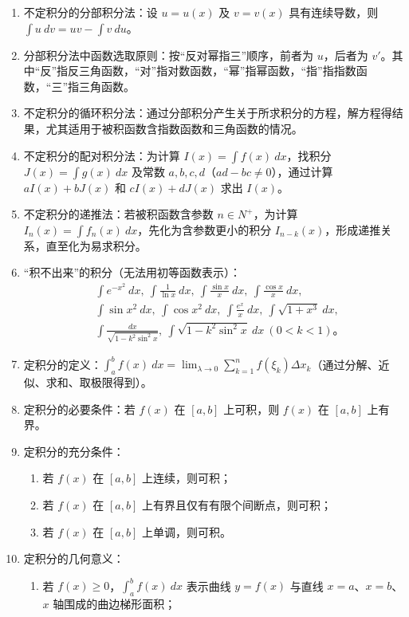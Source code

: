 \documentclass[UTF8]{ctexart}
\theoremstyle{remark}
\begin{document}
\begin{enumerate}
	\item 不定积分的分部积分法：设 \(u = u(x)\) 及 \(v = v(x)\) 具有连续导数，则 \(\int u\ dv = uv - \int v\ du\)。    
	\item 分部积分法中函数选取原则：按“反对幂指三”顺序，前者为 \(u\)，后者为 \(v'\)。其中“反”指反三角函数，“对”指对数函数，“幂”指幂函数，“指”指指数函数，“三”指三角函数。    
	\item 不定积分的循环积分法：通过分部积分产生关于所求积分的方程，解方程得结果，尤其适用于被积函数含指数函数和三角函数的情况。    
	\item 不定积分的配对积分法：为计算 \(I(x) = \int f(x)\ dx\)，找积分 \(J(x) = \int g(x)\ dx\) 及常数 \(a, b, c, d\)（\(ad - bc \neq 0\)），通过计算 \(aI(x) + bJ(x)\) 和 \(cI(x) + dJ(x)\) 求出 \(I(x)\)。    
	\item 不定积分的递推法：若被积函数含参数 \(n \in N^+\)，为计算 \(I_n(x) = \int f_n(x)\ dx\)，先化为含参数更小的积分 \(I_{n-k}(x)\)，形成递推关系，直至化为易求积分。    
	\item “积不出来”的积分（无法用初等函数表示）：    
	\begin{align*}
		&\int e^{-x^2}\ dx,\ \int \frac{1}{\ln x}\ dx,\ \int \frac{\sin x}{x}\ dx,\ \int \frac{\cos x}{x}\ dx, \\
		&\int \sin x^2\ dx,\ \int \cos x^2\ dx,\ \int \frac{e^x}{x}\ dx,\ \int \sqrt{1 + x^3}\ dx, \\
		&\int \frac{dx}{\sqrt{1 - k^2 \sin^2 x}},\ \int \sqrt{1 - k^2 \sin^2 x}\ dx\ (0 < k < 1)。
	\end{align*}    
	\item 定积分的定义：\(\int_{a}^{b} f(x)\ dx = \lim_{\lambda \to 0} \sum_{k=1}^{n} f(\xi_k) \Delta x_k\)（通过分解、近似、求和、取极限得到）。    
	\item 定积分的必要条件：若 \(f(x)\) 在 \([a, b]\) 上可积，则 \(f(x)\) 在 \([a, b]\) 上有界。    
	\item 定积分的充分条件：    
	\begin{enumerate}
		\item 若 \(f(x)\) 在 \([a, b]\) 上连续，则可积；    
		\item 若 \(f(x)\) 在 \([a, b]\) 上有界且仅有有限个间断点，则可积；    
		\item 若 \(f(x)\) 在 \([a, b]\) 上单调，则可积。    
	\end{enumerate}    
	\item 定积分的几何意义：    
	\begin{enumerate}
		\item 若 \(f(x) \geq 0\)，\(\int_{a}^{b} f(x)\ dx\) 表示曲线 \(y = f(x)\) 与直线 \(x = a\)、\(x = b\)、\(x\) 轴围成的曲边梯形面积；    

\end{enumerate}
\end{enumerate}
\end{document}
